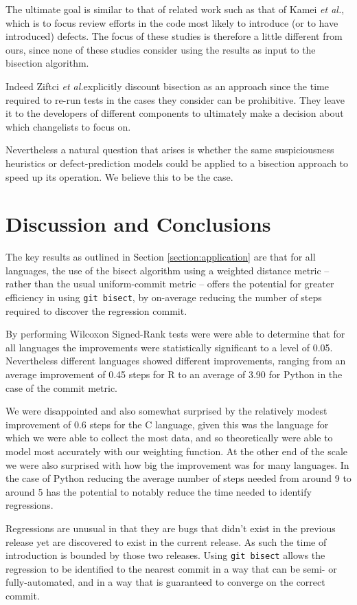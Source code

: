 \documentclass[pdflatex, sn-mathphys, referee]{sn-jnl}%
\theoremstyle{thmstyleone}%
\theoremstyle{thmstyletwo}%
\theoremstyle{thmstylethree}%
\def\etal{{\it et al.}}
\def\code{\tt}
\theoremstyle{thmstyleone}
\begin{document}
The ultimate goal is similar to that of related work such as that of Kamei \etal, which is to focus review efforts in the code most likely to introduce (or to have introduced) defects. The focus of these studies is therefore a little different from ours, since none of these studies consider using the results as input to the bisection algorithm.

Indeed Ziftci \etal explicitly discount bisection as an approach since the time required to re-run tests in the cases they consider can be prohibitive. They leave it to the developers of different components to ultimately make a decision about which changelists to focus on.

Nevertheless a natural question that arises is whether the same suspiciousness heuristics or defect-prediction models could be applied to a bisection approach to speed up its operation. We believe this to be the case. 

\section{Discussion and Conclusions}

The key results as outlined in Section \ref{section:application} are that for all languages, the use of the bisect algorithm using a weighted distance metric -- rather than the usual uniform-commit metric -- offers the potential for greater efficiency in using {\code git bisect}, by on-average reducing the number of steps required to discover the regression commit.

By performing Wilcoxon Signed-Rank tests were were able to determine that for all languages the improvements were statistically significant to a level of 0.05. Nevertheless different languages showed different improvements, ranging from an average improvement of 0.45 steps for R to an average of 3.90 for Python in the case of the commit metric.

We were disappointed and also somewhat surprised by the relatively modest improvement of 0.6 steps for the C language, given this was the language for which we were able to collect the most data, and so theoretically were able to model most accurately with our weighting function. At the other end of the scale we were also surprised with how big the improvement was for many languages. In the case of Python reducing the average number of steps needed from around 9 to around 5 has the potential to notably reduce the time needed to identify regressions.

Regressions are unusual in that they are bugs that didn't exist in the previous release yet are discovered to exist in the current release. As such the time of introduction is bounded by those two releases. Using {\code git bisect} allows the regression to be identified to the nearest commit in a way that can be semi- or fully-automated, and in a way that is guaranteed to converge on the correct commit.
\end{document}
